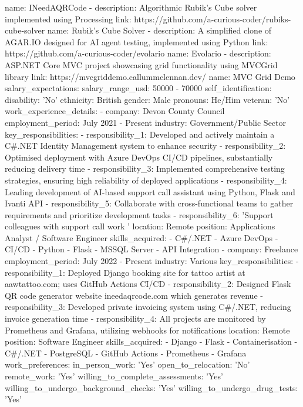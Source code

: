 \documentclass{resume}
\begin{document}
  name: INeedAQRCode
- description: Algorithmic Rubik's Cube solver implemented using Processing
  link: https://github.com/a-curious-coder/rubiks-cube-solver
  name: Rubik's Cube Solver
- description: A simplified clone of AGAR.IO designed for AI agent testing, implemented
    using Python
  link: https://github.com/a-curious-coder/evolario
  name: Evolario
- description: ASP.NET Core MVC project showcasing grid functionality using MVCGrid
    library
  link: https://mvcgriddemo.callummclennan.dev/
  name: MVC Grid Demo
salary_expectations:
  salary_range_usd: 50000 - 70000
self_identification:
  disability: 'No'
  ethnicity: British
  gender: Male
  pronouns: He/Him
  veteran: 'No'
work_experience_details:
- company: Devon County Council
  employment_period: July 2021 - Present
  industry: Government/Public Sector
  key_responsibilities:
  - responsibility_1: Developed and actively maintain a C#.NET Identity Management
      system to enhance security
  - responsibility_2: Optimised deployment with Azure DevOps CI/CD pipelines, substantially
      reducing delivery time
  - responsibility_3: Implemented comprehensive testing strategies, ensuring high
      reliability of deployed applications
  - responsibility_4: Leading development of AI-based support call assistant using
      Python, Flask and Ivanti API
  - responsibility_5: Collaborate with cross-functional teams to gather requirements
      and prioritize development tasks
  - responsibility_6: 'Support colleagues with support call work '
  location: Remote
  position: Applications Analyst / Software Engineer
  skills_acquired:
  - C#/.NET
  - Azure DevOps
  - CI/CD
  - Python
  - Flask
  - MSSQL Server
  - API Integration
- company: Freelance
  employment_period: July 2022 - Present
  industry: Various
  key_responsibilities:
  - responsibility_1: Deployed Django booking site for tattoo artist at aawtattoo.com;
      uses GitHub Actions CI/CD
  - responsibility_2: Designed Flask QR code generator website ineedaqrcode.com which
      generates revenue
  - responsibility_3: Developed private invoicing system using C#/.NET, reducing invoice
      generation time
  - responsibility_4: All projects are monitored by Prometheus and Grafana, utilizing
      webhooks for notifications
  location: Remote
  position: Software Engineer
  skills_acquired:
  - Django
  - Flask
  - Containerisation
  - C#/.NET
  - PostgreSQL
  - GitHub Actions
  - Prometheus
  - Grafana
work_preferences:
  in_person_work: 'Yes'
  open_to_relocation: 'No'
  remote_work: 'Yes'
  willing_to_complete_assessments: 'Yes'
  willing_to_undergo_background_checks: 'Yes'
  willing_to_undergo_drug_tests: 'Yes'
\end{document}
